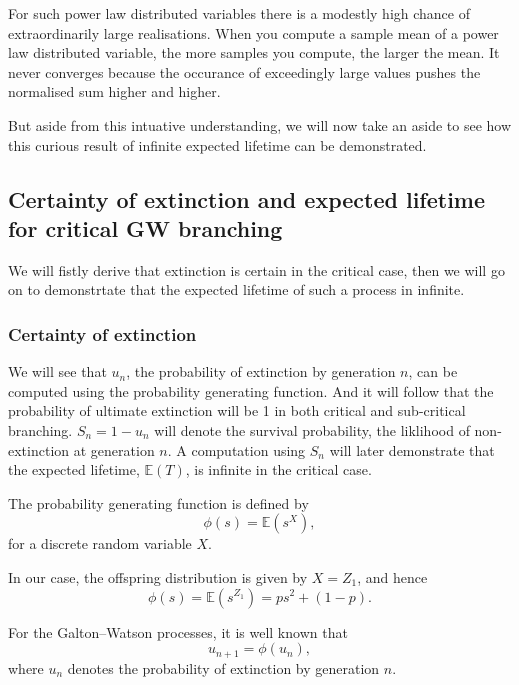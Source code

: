 \documentclass[11pt,a4paper]{article}
\theoremstyle{plain}
\theoremstyle{definition}
\begin{document}
\noindent
For such power law distributed variables there is a modestly high chance of extraordinarily large realisations. 
When you compute a sample mean of a power law distributed variable, the more samples you compute, the larger the mean. 
It never converges because the occurance of exceedingly large values pushes the normalised sum higher and higher. 

But aside from this intuative understanding, we will now take an aside to see how this curious result of infinite expected lifetime can be demonstrated.


\subsection{Certainty of extinction and expected lifetime for critical GW branching}

We will fistly derive that extinction is certain in the critical case, then we will go on to demonstrtate that the
expected lifetime of such a process in infinite. 







\subsubsection{Certainty of extinction}


We will see that $u_n$, the probability of extinction by generation $n$, can be computed
using the probability generating function. And it will follow that the probability of ultimate 
extinction will be 1 in both critical and sub-critical branching. $S_n = 1-u_n$ will denote the survival probability,
the liklihood of non-extinction at generation $n$. A computation using $S_n$ will later demonstrate that the expected lifetime, $\mathbb{E}(T)$, is infinite in the critical case.

\vspace{12pt}


\noindent
The probability generating function is defined by
\[
\phi(s) = \mathbb{E}(s^{X}),
\]
for a discrete random variable $X$.

In our case, the offspring distribution is given by $X = Z_1$, and hence
\[
\phi(s) = \mathbb{E}(s^{Z_1}) = p s^2 + (1-p).
\]


\noindent
For the Galton--Watson processes, it is well known that
\[
u_{n+1} = \phi(u_n),
\]
where $u_n$ denotes the probability of extinction by generation $n$.
\end{document}
